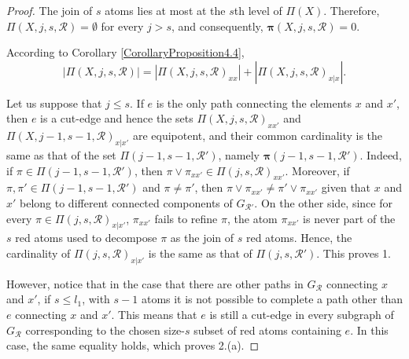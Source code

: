 \documentclass[12pt]{extarticle}
\begin{document}
	\begin{proof}
		The join of $s$ atoms lies at most at the $s$th level of $\Pi(X)$. Therefore, $\Pi(X,j,s,\mathcal{R})=\emptyset$ for every $j>s$, and consequently, $\bm{\pi}(X, j,s,\mathcal{R})=0$.
		
		According to Corollary \ref{CorollaryProposition4.4},   	\begin{equation}
		|\Pi(X, j, s,\mathcal{R})| = |\Pi(X, j, s,\mathcal{R})_{xx}|+|\Pi(X,j, s,\mathcal{R})_{x|x}|.
		\end{equation}
		
		 Let us suppose that $j\leq s$. If $e$ is the only path connecting the elements $x$ and $x'$, then $e$ is a cut-edge and hence the sets $\Pi(X,j,s,\mathcal{R})_{xx'}$ and $\Pi(X,j-1,s-1,\mathcal{R})_{x|x'}$ are equipotent, and their common cardinality is the same as that of the set $\Pi(j-1,s-1,\mathcal{R}')$, namely $\bm{\pi}(j-1,s-1,\mathcal{R}')$. Indeed, if $\pi\in\Pi(j-1,s-1,\mathcal{R}')$, then $\pi\vee\pi_{xx'}\in \Pi(j,s,\mathcal{R})_{xx'}$. Moreover, if $\pi,\pi'\in\Pi(j-1,s-1,\mathcal{R}')$ and $\pi\neq\pi'$, then $\pi\vee\pi_{xx'}\neq\pi'\vee\pi_{xx'}$ given that $x$ and $x'$ belong to different connected components of $G_{\mathcal{R}'}$. On the other side, since for every $\pi\in\Pi(j,s,\mathcal{R})_{x|x'}$, $\pi_{xx'}$ fails to refine $\pi$, the atom $\pi_{xx'}$ is never part of the $s$ red atoms used to decompose $\pi$ as the join of $s$ red atoms. Hence, the cardinality of $\Pi(j,s,\mathcal{R})_{x|x'}$ is the same as that of $\Pi(j,s,\mathcal{R}')$. This proves 1.
		
		However, notice that in the case that there are other paths in $G_{\mathcal{R}}$ connecting $x$ and $x'$, if $s\leq l_1$,  with $s-1$ atoms it is not possible to complete a path other than $e$ connecting $x$ and $x'$. This means that $e$ is still a cut-edge in every subgraph of $G_{\mathcal{R}}$ corresponding to the chosen size-$s$ subset of red atoms containing $e$. In this case, the same equality holds, which proves 2.(a).
		

\end{proof}
\end{document}
